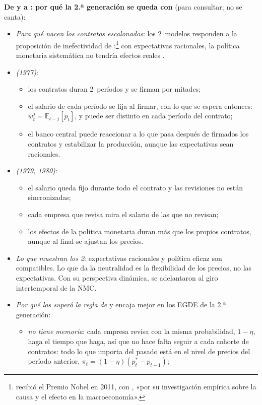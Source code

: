 \documentclass[11pt]{article}
\begin{document}
\begin{anotaciones}
\textbf{De  y  a : por qué la 2.ª generación se queda con } (para consultar; no se canta):
\begin{itemize}
\item \emph{Para qué nacen los contratos escalonados}: los 2~modelos responden a la proposición de inefectividad de \textcite{SargentWallace1975Rational}:\footnote{ recibió el Premio Nobel en 2011, con , «por su investigación empírica sobre la causa y el efecto en la macroeconomía»\nocite{Nobel2011SargentSims}.} con expectativas racionales, la política monetaria sistemática no tendría efectos reales .
\item \emph{ (1977)}:
  \begin{itemize}
  \item los contratos duran 2~períodos y se firman por mitades;
  \item el salario de cada período se fija al firmar, con lo que se espera entonces: $w^j_t=\mathbb{E}_{t-j}[p_t]$, y puede ser distinto en cada período del contrato;
  \item el banco central puede reaccionar a lo que pasa después de firmados los contratos y estabilizar la producción, aunque las expectativas sean racionales.
  \end{itemize}
\item \emph{ (1979, 1980)}:
  \begin{itemize}
  \item el salario queda fijo durante todo el contrato y las revisiones no están sincronizadas;
  \item cada empresa que revisa mira el salario de las que no revisan;
  \item los efectos de la política monetaria duran más que los propios contratos, aunque al final se ajustan los precios.
  \end{itemize}
\item \emph{Lo que muestran los 2}: expectativas racionales y política eficaz son compatibles. Lo que da la neutralidad es la flexibilidad de los precios, no las expectativas. Con su perspectiva dinámica, se adelantaron al giro intertemporal de la NMC.
\item \emph{Por qué los superó la regla de \textcite{Calvo1983Staggered}} y encaja mejor en los EGDE de la 2.ª generación:
  \begin{itemize}
  \item \emph{no tiene memoria}: cada empresa revisa con la misma probabilidad, $1-\eta$, haga el tiempo que haga, así que no hace falta seguir a cada cohorte de contratos: todo lo que importa del pasado está en el nivel de precios del período anterior, $\pi_t=(1-\eta)(p^*_t-p_{t-1})$;

\end{itemize}
\end{itemize}
\end{anotaciones}
\end{document}
